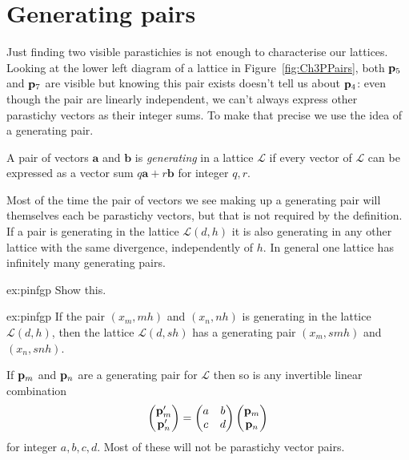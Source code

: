 \section{Generating pairs}
Just finding two visible parastichies is not enough to characterise our lattices.  Looking at the lower left diagram of a lattice in Figure~\ref{fig:Ch3PPairs}, both ${\mathbf p}_{5}$ and ${\mathbf p}_{7}$ are visible but knowing this pair exists doesn't tell us about ${\mathbf p}_{4}$: even though the pair  are linearly independent, we can't always express other parastichy vectors as their integer sums.  To make that precise we use the idea of a generating pair. 
\begin{definition} A pair of vectors $\mathbf{a}$ and $\mathbf{b}$
		   is \emph{generating} in a lattice $\mathcal{L}$ if every vector of $\mathcal{L}$ can be expressed as a vector sum $q\mathbf{a}+r\mathbf{b}$
		   for integer $q,r$.
\label{def:g}
\end{definition}
 Most of the time the pair of vectors we see making up a generating pair will themselves each be parastichy vectors, but that is not required by the definition. If a pair is generating in the lattice $\mathcal{L}(d,h)$ it is also generating in any other lattice with the same divergence, independently of $h$. In general one lattice has infinitely many generating pairs. 
\begin{jExercise}{ex:pinfgp}
	Show this.
\end{jExercise}
\begin{jAnswer}{ex:pinfgp}
	If the pair $(x_m, m h)$ and $(x_n,n h)$ is generating in the lattice $\mathcal{L}(d,h)$, then the lattice  $\mathcal{L}(d, s h )$ has a generating pair $(x_m, s m h)$ and $(x_n,s n h)$.
	
	If ${\mathbf p}_{m}$ and ${\mathbf p}_{n}$ are a generating pair for $\mathcal{L}$ then so is any invertible linear combination
	\begin{equation}
		\begin{pmatrix}
		{\mathbf p}_{m}' \\ {\mathbf p}_{n}' 
		\end{pmatrix}= 
	\begin{pmatrix}
		a & b  \\ c & d  
	\end{pmatrix}	\begin{pmatrix}
	{\mathbf p}_{m} \\ {\mathbf p}_{n} 
\end{pmatrix}
	\end{equation}
	for integer $a,b,c,d$. Most of these will not be parastichy vector pairs.
\end{jAnswer}

